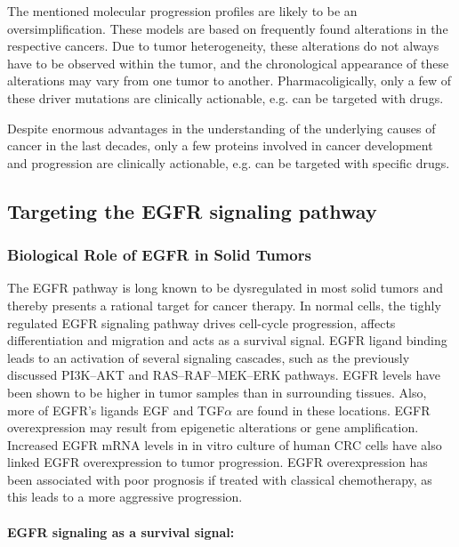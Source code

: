 {{      The mentioned molecular progression profiles are likely to be an
      oversimplification. These models are based on frequently found alterations
      in the respective cancers. Due to tumor heterogeneity, these alterations
      do not always have to be observed within the tumor, and the chronological
      appearance of these alterations may vary from one tumor to another.
      Pharmacoligically, only a few of these driver mutations are clinically
      actionable, e.g. can be targeted with drugs.

      Despite enormous advantages in the understanding of the underlying causes
      of cancer in the last decades, only a few proteins involved in cancer
      development and progression are clinically actionable, e.g. can be
      targeted with specific drugs.

  \subsection{Targeting the EGFR signaling pathway}

    \subsubsection{Biological Role of EGFR in Solid Tumors}

      The EGFR pathway is long known to be dysregulated in most solid tumors
      and thereby presents a rational target for cancer therapy.
      In normal cells, the tighly regulated EGFR signaling pathway drives
      cell-cycle progression, affects differentiation and migration and acts as
      a survival signal. EGFR ligand binding leads to an activation of several
      signaling cascades, such as the previously discussed PI3K--AKT and
      RAS--RAF--MEK--ERK pathways. EGFR levels have been shown to be
      higher in tumor samples than in surrounding tissues. Also, more of EGFR's
      ligands EGF and TGF$\alpha$ are found in these locations. EGFR
      overexpression may result from epigenetic alterations or gene
      amplification. Increased EGFR mRNA levels in in vitro culture of human CRC
      cells have also linked EGFR overexpression to tumor progression. EGFR
      overexpression has been associated with poor prognosis if treated with
      classical chemotherapy, as this leads to a more aggressive progression.

      \paragraph{EGFR signaling as a survival signal: }

}}
